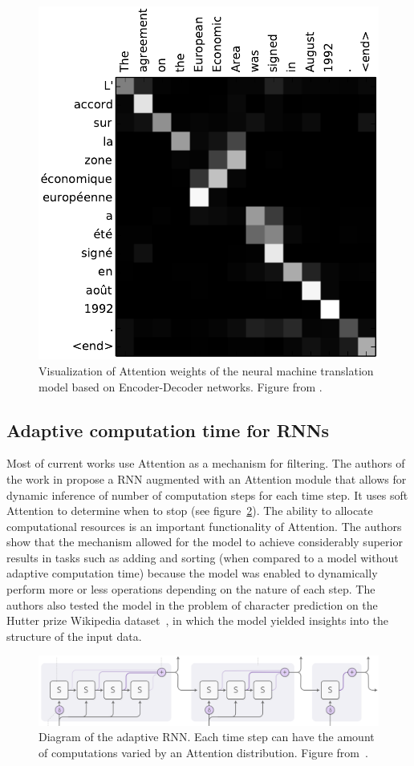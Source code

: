 \documentclass[English]{style/ic-tese-v3}
\begin{document}
\begin{figure}
\begin{center}
    \includegraphics[width=0.5\linewidth]{./img/nt-att.png}
\caption{
    Visualization of Attention weights of the neural machine translation model
    based on Encoder-Decoder networks.
    Figure from \cite{ref:enc-dec}.
}
\label{fig:ntatt}
\end{center}
\end{figure}

\subsection{Adaptive computation time for RNNs}
Most of current works use Attention as a mechanism for filtering.
The authors of the work in \cite{ref:act} propose a RNN augmented with an Attention module that allows for
dynamic inference of number of computation steps for each time step.
It uses soft Attention to determine when to stop (see figure~\ref{fig:adaptive-comp}).
The ability to allocate computational resources is an important functionality of Attention.
The authors show that the mechanism allowed for the model to achieve considerably superior results
in tasks such as adding and sorting (when compared to a model without adaptive computation time)
because the model was enabled to dynamically perform more or less operations depending on the nature
of each step.
The authors also tested the model in the problem of character prediction on the Hutter prize Wikipedia
dataset~\cite{ref:hutter}, in which the model yielded insights into the structure of the input data.

\begin{figure}
\begin{center}
    \includegraphics[width=1.0\linewidth]{./img/adaptive_comp.png}
\caption{
    Diagram of the adaptive RNN.
    Each time step can have the amount of computations varied by an Attention distribution.
    Figure from~\cite{ref:distill}.
}
\label{fig:adaptive-comp}
\end{center}
\end{figure}
\end{document}
